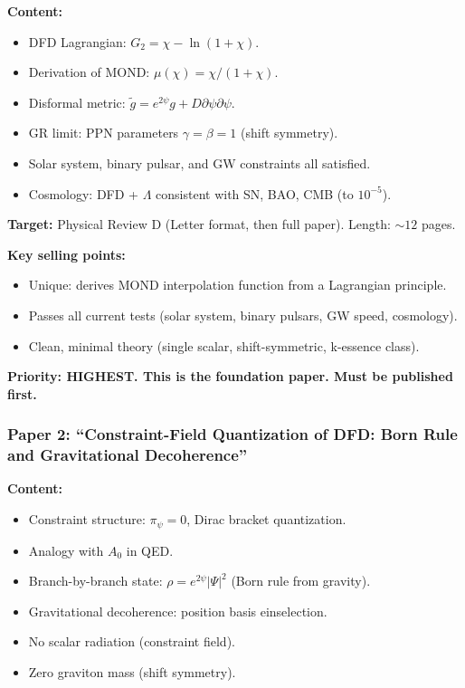 \documentclass[11pt,a4paper]{article}
\begin{document}
\textbf{Content:}
\begin{itemize}
\item DFD Lagrangian: $G_2 = \chi - \ln(1+\chi)$.
\item Derivation of MOND: $\mu(\chi) = \chi/(1+\chi)$.
\item Disformal metric: $\tilde{g} = e^{2\psi}g + D\partial\psi\partial\psi$.
\item GR limit: PPN parameters $\gamma = \beta = 1$ (shift symmetry).
\item Solar system, binary pulsar, and GW constraints all satisfied.
\item Cosmology: DFD + $\Lambda$ consistent with SN, BAO, CMB (to $10^{-5}$).
\end{itemize}

\textbf{Target:} Physical Review D (Letter format, then full paper). Length: $\sim 12$ pages.

\textbf{Key selling points:}
\begin{itemize}
\item Unique: derives MOND interpolation function from a Lagrangian principle.
\item Passes all current tests (solar system, binary pulsars, GW speed, cosmology).
\item Clean, minimal theory (single scalar, shift-symmetric, k-essence class).
\end{itemize}

\textbf{Priority: HIGHEST. This is the foundation paper. Must be published first.}

\subsubsection{Paper 2: ``Constraint-Field Quantization of DFD: Born Rule and Gravitational Decoherence''}

\textbf{Content:}
\begin{itemize}
\item Constraint structure: $\pi_\psi = 0$, Dirac bracket quantization.
\item Analogy with $A_0$ in QED.
\item Branch-by-branch state: $\rho = e^{2\psi}|\Psi|^2$ (Born rule from gravity).
\item Gravitational decoherence: position basis einselection.
\item No scalar radiation (constraint field).
\item Zero graviton mass (shift symmetry).
\end{itemize}
\end{document}
